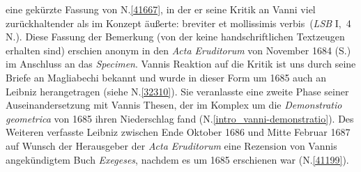 \begin{ledgroup}
eine gekürzte Fassung von N.\;\ref{41667}, in der er seine Kritik an Vanni viel zurückhaltender als im Konzept äußerte: \glqq breviter et mollissimis verbis\grqq\ (\cite{02007}\textit{LSB} I,~4 N.).
Diese Fassung der Bemerkung (von der keine handschriftlichen Textzeugen erhalten sind) 
erschien anonym in den \textit{Acta Eruditorum} von November 1684 (S.)
im Anschluss an das \cite{01995}\textit{Specimen}.%
\pend
\pstart
{}Vannis Reaktion auf die Kritik ist uns durch seine Briefe an Magliabechi bekannt und wurde in dieser Form um 1685 auch an Leibniz herangetragen (siehe N.\;\ref{32310}). Sie veranlasste eine zweite Phase seiner Auseinandersetzung mit Vannis Thesen, der im Komplex um die \textit{Demonstratio geometrica} von 1685 ihren Niederschlag fand (N.\;\ref{intro_vanni-demonstratio}).
Des Weiteren verfasste Leibniz zwischen Ende Oktober 1686 und Mitte Februar 1687 auf Wunsch der Herausgeber der \textit{Acta Eruditorum} eine Rezension von Vannis angekündigtem Buch \textit{Exegeses}, nachdem es um 1685 erschienen war (N.\;\ref{41199}).
\pend
\end{ledgroup}




